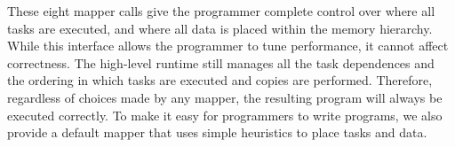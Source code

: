 




These eight mapper calls give the programmer complete control over where all tasks are executed, and
where all data is placed within the memory hierarchy.  While this interface allows the programmer
to tune performance, it cannot affect correctness.  The high-level runtime still manages all the task dependences and the
ordering in which tasks are executed and copies are performed.  Therefore, regardless of choices
made by any mapper, the resulting program will always be executed correctly.
To make it easy for programmers to write programs, we also provide a default
 mapper that uses simple heuristics to place tasks and data.  

